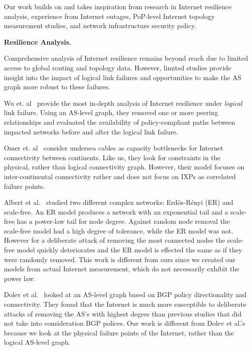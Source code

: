 Our work builds on and takes inspiration from research in Internet resilience
analysis, experience from Internet outages, PoP-level Internet topology
measurement studies, and network infrastructure security policy.

{\bf Resilience Analysis.}

    Comprehensive analysis of Internet resilience remains beyond reach due to
    limited access to global routing and topology data.  However, limited
    studies provide insight into the impact of logical link failures and
    opportunities to make the AS graph more robust to these failures.
    
    Wu et. al~\cite{michigan} provide the most in-depth analysis of Internet
    resilience under {\it logical} link failure.  Using an AS-level graph, they
    removed one or more peering relationships and evaluated the availability of
    policy-compliant paths between impacted networks before and after the
    logical link failure.

    Omer et. al~\cite{measuringresilience} consider undersea cables as capacity
    bottlenecks for Internet connectivity between continents.  Like us, they
    look for constraints in the physical, rather than logical connectivity
    graph.  However, their model focuses on inter-continental connectivity
    rather and does not focus on IXPs as correlated failure points.

     Albert
    et al.~\cite{resilience-complex-networks} studied two different complex
    networks: Erd\"{o}s-R\'{e}nyi (ER) and scale-free. An ER model produces a
    network with an exponential tail and a scale-free has a power-law tail for
    node degree. Against random node removal the scale-free model had a high
    degree of tolerance, while the ER model was not. However for a deliberate
    attack of removing the most connected nodes the scale-free model quickly
    deteriorates and the ER model is effected the same as if they were
    randomly removed. This work is different from ours since we created our
    models from actual Internet measurement, which do not necessarily exhibit
    the power law.

    Dolev et al.~\cite{resilience-under-BGP} looked at an AS-level graph based
    on BGP policy directionality and connectivity. They found that the Internet
    is much more susceptible to deliberate attacks of removing the AS's with
    highest degree than previous studies that did not take into consideration
    BGP polices. Our work is different from Dolev et al.'s because we look at
    the physical failure points of the Internet, rather than the logical
    AS-level graph.
    
